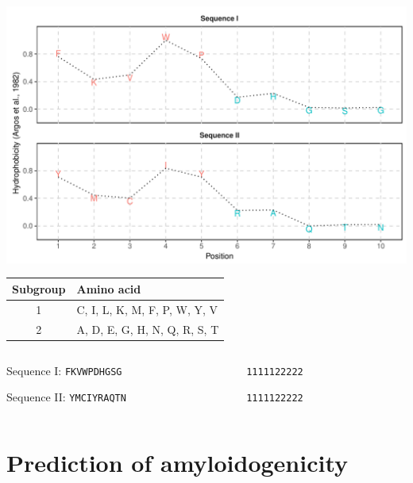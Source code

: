 \documentclass{beamer}\usepackage[]{graphicx}\usepackage[]{color}
\makeatletter
\def\maxwidth{ %
  \ifdim\Gin@nat@width>\linewidth
    \linewidth
  \else
    \Gin@nat@width
  \fi
}
\makeatother
\begin{document}
\begin{frame}

\includegraphics[width=\maxwidth]{figure/unnamed-chunk-8-1} 


\end{frame}  

\begin{frame}
\begin{table}
\begin{tabular}{cl}
\toprule
Subgroup & Amino acid \\ 
\midrule
  1 & C, I, L, K, M, F, P, W, Y, V \\ 
\rowcolor[gray]{0.85}  2 & A, D, E, G, H, N, Q, R, S, T \\ 
\bottomrule
\end{tabular}
\end{table}

\begin{columns}
\begin{column}{0.44\textwidth}
 
Sequence I: \texttt{FKVWPDHGSG} \textrightarrow

Sequence II: \texttt{YMCIYRAQTN} \textrightarrow

\end{column}
\begin{column}{0.5\textwidth}  %

\texttt{1111122222}

\texttt{1111122222}
\end{column}
\end{columns}
\end{frame}  



\section{Prediction of amyloidogenicity}
\end{document}
